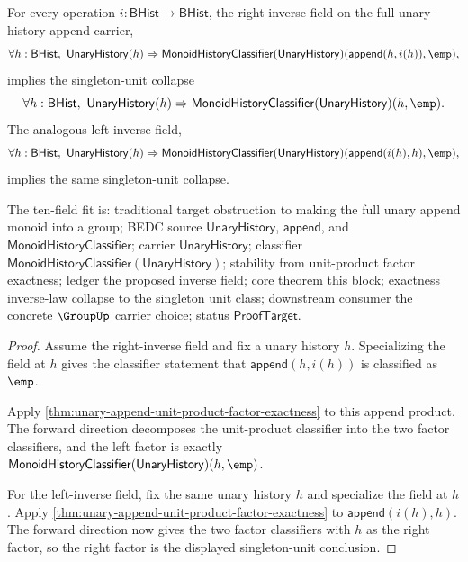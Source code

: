 \begin{theorem}
\label{thm:unary-append-inverse-field-collapses-to-singleton}
For every operation $i:\mathsf{BHist}\to\mathsf{BHist}$, the right-inverse
field on the full unary-history append carrier,
$$
\forall h:\mathsf{BHist},\
\mathsf{UnaryHistory}(h)\Rightarrow
\mathsf{MonoidHistoryClassifier}(\mathsf{UnaryHistory})
(\mathsf{append}(h,i(h)),\emp),
$$
implies the singleton-unit collapse
$$
\forall h:\mathsf{BHist},\
\mathsf{UnaryHistory}(h)\Rightarrow
\mathsf{MonoidHistoryClassifier}(\mathsf{UnaryHistory})(h,\emp).
$$
The analogous left-inverse field,
$$
\forall h:\mathsf{BHist},\
\mathsf{UnaryHistory}(h)\Rightarrow
\mathsf{MonoidHistoryClassifier}(\mathsf{UnaryHistory})
(\mathsf{append}(i(h),h),\emp),
$$
implies the same singleton-unit collapse.

The ten-field fit is: traditional target obstruction to making the full unary
append monoid into a group; BEDC source $\mathsf{UnaryHistory}$,
$\mathsf{append}$, and
$\mathsf{MonoidHistoryClassifier}$; carrier $\mathsf{UnaryHistory}$;
classifier $\mathsf{MonoidHistoryClassifier}(\mathsf{UnaryHistory})$;
stability from unit-product factor exactness; ledger the proposed inverse
field; core theorem this block; exactness inverse-law collapse to the
singleton unit class; downstream consumer the concrete $\GroupUp$ carrier
choice; status $\mathsf{ProofTarget}$.
\end{theorem}
\begin{proof}
Assume the right-inverse field and fix a unary history $h$. Specializing the
field at $h$ gives the classifier statement that
$\mathsf{append}(h,i(h))$ is classified as $\emp$.

Apply \autoref{thm:unary-append-unit-product-factor-exactness} to this append
product. The forward direction decomposes the unit-product classifier into the
two factor classifiers, and the left factor is exactly
$\mathsf{MonoidHistoryClassifier}(\mathsf{UnaryHistory})(h,\emp)$.

For the left-inverse field, fix the same unary history $h$ and specialize the
field at $h$. Apply
\autoref{thm:unary-append-unit-product-factor-exactness} to
$\mathsf{append}(i(h),h)$. The forward direction now gives the two factor
classifiers with $h$ as the right factor, so the right factor is the displayed
singleton-unit conclusion.
\end{proof}

